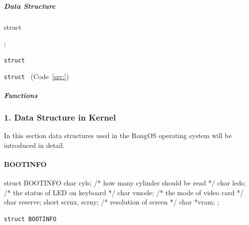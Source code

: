\documentclass{swfcthesis}
\begin{document}
\subsubsection{}
\label{sec:}


  
\subparagraph{Data Structure}

\paragraph{}

\begin{listing}[H]
  \begin{codeblock}
\begin{ccode}
struct 
{ 
  
};
\end{ccode}
  \end{codeblock}
  \caption{\texttt{struct }}\label{src:}
\end{listing}

\texttt{struct } (Code~\ref{src:})

\subparagraph{ Functions}

\begin{description}
  
\item[\texttt{}]
\item[\texttt{}]
  
\end{description}


\iffalse %
\subsubsection{1. Data Structure in Kernel}
In this section data structures used in the RongOS operating system will be introduced in
detail.

\paragraph{BOOTINFO}

\begin{listing}[H]
  \begin{codeblock}
\begin{ccode}
struct BOOTINFO
{
  char cyls;          /* how many cylinder should be read */
  char leds;          /* the status of LED on keyboard */
  char vmode;         /* the mode of video card */
  char reserve;
  short scrnx, scrny; /* resolution of screen */
  char *vram;
};
\end{ccode}
  \end{codeblock}
  \caption{\texttt{struct BOOTINFO}}\label{src:bootinfo}
\end{listing}
\end{document}
